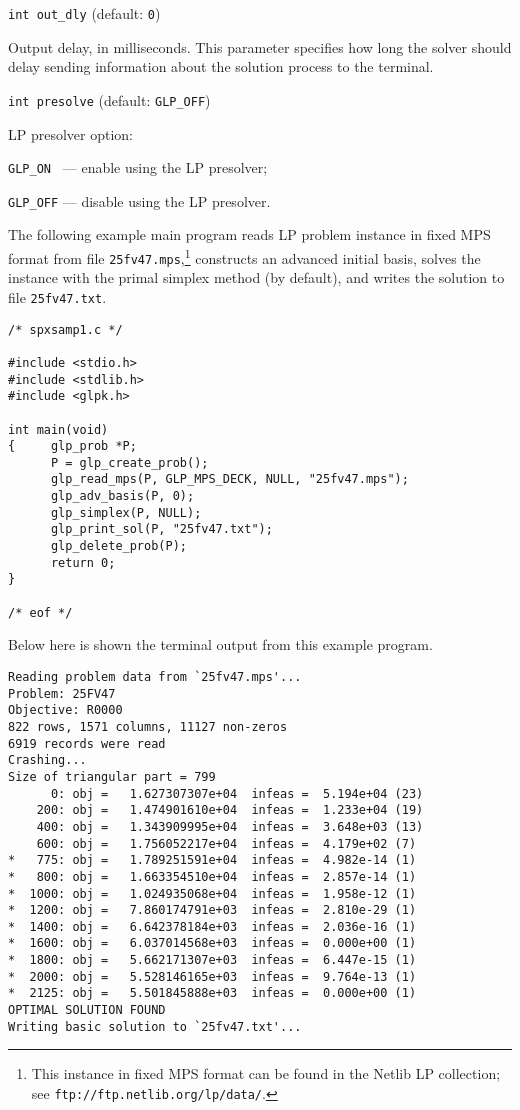 {\tt int out\_dly} (default: {\tt 0})

Output delay, in milliseconds. This parameter specifies how long the
solver should delay sending information about the solution process to
the terminal.

\bigskip

{\tt int presolve} (default: {\tt GLP\_OFF})

LP presolver option:

\verb|GLP_ON | --- enable using the LP presolver;

\verb|GLP_OFF| --- disable using the LP presolver.

\newpage


The following example main program reads LP problem instance in fixed
MPS format from file \verb|25fv47.mps|,\footnote{This instance in fixed
MPS format can be found in the Netlib LP collection; see
{\tt ftp://ftp.netlib.org/lp/data/}.} constructs an advanced initial
basis, solves the instance with the primal simplex method (by default),
and writes the solution to file \verb|25fv47.txt|.

\begin{footnotesize}
\begin{verbatim}
/* spxsamp1.c */

#include <stdio.h>
#include <stdlib.h>
#include <glpk.h>

int main(void)
{     glp_prob *P;
      P = glp_create_prob();
      glp_read_mps(P, GLP_MPS_DECK, NULL, "25fv47.mps");
      glp_adv_basis(P, 0);
      glp_simplex(P, NULL);
      glp_print_sol(P, "25fv47.txt");
      glp_delete_prob(P);
      return 0;
}

/* eof */
\end{verbatim}
\end{footnotesize}

Below here is shown the terminal output from this example program.

\begin{footnotesize}
\begin{verbatim}
Reading problem data from `25fv47.mps'...
Problem: 25FV47
Objective: R0000
822 rows, 1571 columns, 11127 non-zeros
6919 records were read
Crashing...
Size of triangular part = 799
      0: obj =   1.627307307e+04  infeas =  5.194e+04 (23)
    200: obj =   1.474901610e+04  infeas =  1.233e+04 (19)
    400: obj =   1.343909995e+04  infeas =  3.648e+03 (13)
    600: obj =   1.756052217e+04  infeas =  4.179e+02 (7)
*   775: obj =   1.789251591e+04  infeas =  4.982e-14 (1)
*   800: obj =   1.663354510e+04  infeas =  2.857e-14 (1)
*  1000: obj =   1.024935068e+04  infeas =  1.958e-12 (1)
*  1200: obj =   7.860174791e+03  infeas =  2.810e-29 (1)
*  1400: obj =   6.642378184e+03  infeas =  2.036e-16 (1)
*  1600: obj =   6.037014568e+03  infeas =  0.000e+00 (1)
*  1800: obj =   5.662171307e+03  infeas =  6.447e-15 (1)
*  2000: obj =   5.528146165e+03  infeas =  9.764e-13 (1)
*  2125: obj =   5.501845888e+03  infeas =  0.000e+00 (1)
OPTIMAL SOLUTION FOUND
Writing basic solution to `25fv47.txt'...
\end{verbatim}
\end{footnotesize}

